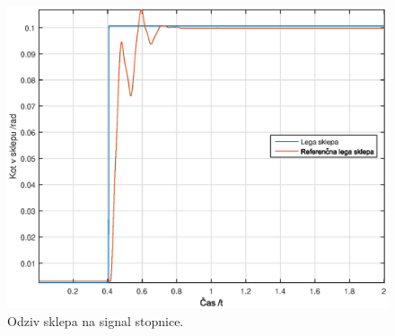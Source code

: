 \begin{figure}
	\centering
	\includegraphics[scale=0.5]{./Slike/torque_follow_step.eps}
	\caption{Odziv sklepa na signal stopnice.}
	\label{fig:torque_follow_step}
\end{figure}

